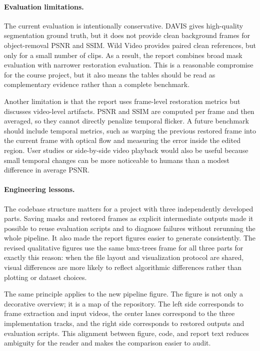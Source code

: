 \documentclass[10pt,twocolumn,letterpaper]{article}
\begin{document}
\paragraph{Evaluation limitations.}
The current evaluation is intentionally conservative. DAVIS gives high-quality segmentation ground truth, but it does not provide clean background frames for object-removal PSNR and SSIM. Wild Video provides paired clean references, but only for a small number of clips. As a result, the report combines broad mask evaluation with narrower restoration evaluation. This is a reasonable compromise for the course project, but it also means the tables should be read as complementary evidence rather than a complete benchmark.

Another limitation is that the report uses frame-level restoration metrics but discusses video-level artifacts. PSNR and SSIM are computed per frame and then averaged, so they cannot directly penalize temporal flicker. A future benchmark should include temporal metrics, such as warping the previous restored frame into the current frame with optical flow and measuring the error inside the edited region. User studies or side-by-side video playback would also be useful because small temporal changes can be more noticeable to humans than a modest difference in average PSNR.

\paragraph{Engineering lessons.}
The codebase structure matters for a project with three independently developed parts. Saving masks and restored frames as explicit intermediate outputs made it possible to reuse evaluation scripts and to diagnose failures without rerunning the whole pipeline. It also made the report figures easier to generate consistently. The revised qualitative figures use the same bmx-trees frame for all three parts for exactly this reason: when the file layout and visualization protocol are shared, visual differences are more likely to reflect algorithmic differences rather than plotting or dataset choices.

The same principle applies to the new pipeline figure. The figure is not only a decorative overview; it is a map of the repository. The left side corresponds to frame extraction and input videos, the center lanes correspond to the three implementation tracks, and the right side corresponds to restored outputs and evaluation scripts. This alignment between figure, code, and report text reduces ambiguity for the reader and makes the comparison easier to audit.
\end{document}
